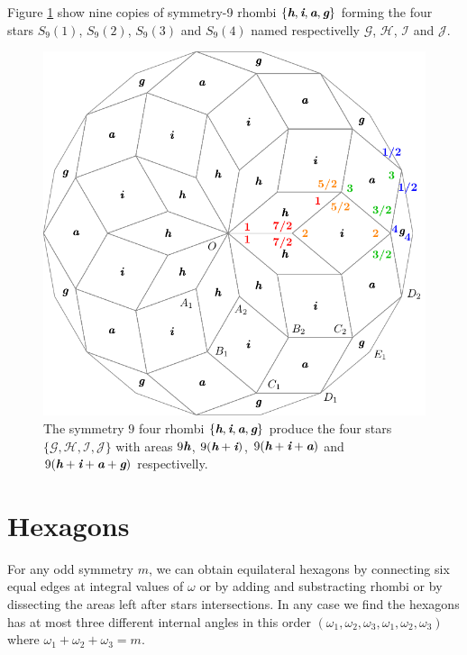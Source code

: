 \documentclass[11pt]{article}
\def\mathbi#1{\textbf{\em #1}}
\begin{document}
Figure \ref{fig:rhombi-9} show nine copies of symmetry-9 rhombi $\{\mathbi{h},\mathbi{i},\mathbi{a},\mathbi{g}\}$ forming the four stars $S_9(1)$, $S_9(2)$, $S_9(3)$ and $S_9(4)$ named respectivelly $\mathcal{G}$, $\mathcal{H}$, $\mathcal{I}$ and $\mathcal{J}$.

\begin{figure}[H]
\centering
\includegraphics[scale=1]{rhombi-9}
\caption{The symmetry $9$ four rhombi $\{\mathbi{h},\mathbi{i},\mathbi{a},\mathbi{g}\}$ produce the four stars $\{\mathcal{G},\mathcal{H},\mathcal{I},\mathcal{J}\}$ with areas
$9\mathbi{h}$,
 $9(\mathbi{h}+\mathbi{i})$,
 $9(\mathbi{h}+\mathbi{i}+\mathbi{a})$ and 
 $9(\mathbi{h}+\mathbi{i}+\mathbi{a}+\mathbi{g})$ respectivelly.}
\label{fig:rhombi-9}
\end{figure}





\section{Hexagons}

For any odd symmetry $m$, we can obtain equilateral hexagons by connecting six equal edges at integral values of $\omega$ or by adding and substracting rhombi or by dissecting the areas left after stars intersections. In any case we find the hexagons has at most three different internal angles in this order $(\omega_1, \omega_2, \omega_3, \omega_1, \omega_2, \omega_3)$ where $\omega_1 + \omega_2 + \omega_3 = m$.
\end{document}
